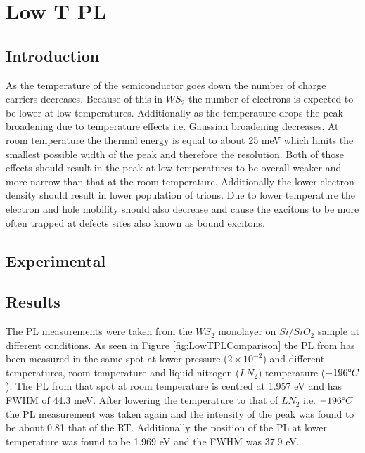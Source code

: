 \section{Low T PL}

\subsection{Introduction}

As the temperature of the semiconductor goes down the number of charge carriers decreases. Because of this in $WS_2$ the number of electrons is expected to be lower at low temperatures. Additionally as the temperature drops the peak broadening due to temperature effects i.e. Gaussian broadening decreases. At room temperature the thermal energy is equal to about 25 meV which limits the smallest possible width of the peak and therefore the resolution. Both of those effects should result in the peak at low temperatures to be overall weaker and more narrow than that at the room temperature. Additionally the lower electron density should result in lower population of trions. Due to lower temperature the electron and hole mobility should also decrease and cause the excitons to be more often trapped at defects sites also known as bound excitons.

\subsection{Experimental}



\subsection{Results}

The PL measurements were taken from the $WS_2$ monolayer on $Si/SiO_2$ sample at different conditions. As seen in Figure \ref{fig:LowTPLComparison} the PL from has been measured in the same spot at lower pressure ($2 \times 10^{-2}$) and different temperatures, room temperature and liquid nitrogen ($LN_2$) temperature ($-196 \degree C$). The PL from that spot at room temperature is centred at 1.957 eV and has FWHM of 44.3 meV. After lowering the temperature to that of $LN_2$ i.e. $-196 \degree C$ the PL measurement was taken again and the intensity of the peak was found to be about 0.81 that of the RT. Additionally the position of the PL at lower temperature was found to be 1.969 eV and the FWHM was 37.9 eV.

